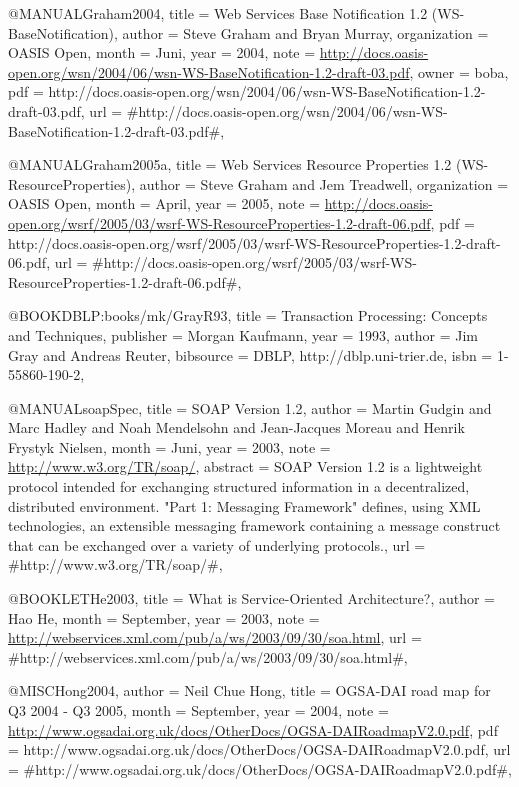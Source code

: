 @MANUAL{Graham2004,
  title = {{Web Services Base Notification 1.2 (WS-BaseNotification)}},
  author = {Steve Graham and Bryan Murray},
  organization = {OASIS Open},
  month = {Juni},
  year = {2004},
  note = {\url{http://docs.oasis-open.org/wsn/2004/06/wsn-WS-BaseNotification-1.2-draft-03.pdf}},
  owner = {boba},
  pdf = {http://docs.oasis-open.org/wsn/2004/06/wsn-WS-BaseNotification-1.2-draft-03.pdf},
  url = {#http://docs.oasis-open.org/wsn/2004/06/wsn-WS-BaseNotification-1.2-draft-03.pdf#},
}

@MANUAL{Graham2005a,
  title = {{Web Services Resource Properties 1.2 (WS-ResourceProperties)}},
  author = {Steve Graham and Jem Treadwell},
  organization = {OASIS Open},
  month = {April},
  year = {2005},
  note = {\url{http://docs.oasis-open.org/wsrf/2005/03/wsrf-WS-ResourceProperties-1.2-draft-06.pdf}},
  pdf = {http://docs.oasis-open.org/wsrf/2005/03/wsrf-WS-ResourceProperties-1.2-draft-06.pdf},
  url = {#http://docs.oasis-open.org/wsrf/2005/03/wsrf-WS-ResourceProperties-1.2-draft-06.pdf#},
}

@BOOK{DBLP:books/mk/GrayR93,
  title = {{Transaction Processing: Concepts and Techniques}},
  publisher = {Morgan Kaufmann},
  year = {1993},
  author = {Jim Gray and Andreas Reuter},
  bibsource = {DBLP, http://dblp.uni-trier.de},
  isbn = {1-55860-190-2},
}

@MANUAL{soapSpec,
  title = {{SOAP Version 1.2}},
  author = {Martin Gudgin and Marc Hadley and Noah Mendelsohn and Jean-Jacques
	Moreau and Henrik Frystyk Nielsen},
  month = {Juni},
  year = {2003},
  note = {\url{http://www.w3.org/TR/soap/}},
  abstract = {SOAP Version 1.2 is a lightweight protocol
intended for exchanging
	structured information in a decentralized,
distributed environment.
	"Part 1: Messaging Framework" defines, using XML
technologies, an
	extensible messaging framework containing a message
construct that
	can be exchanged over a variety of underlying protocols.},
  url = {#http://www.w3.org/TR/soap/#},
}

@BOOKLET{He2003,
  title = {{What is Service-Oriented Architecture?}},
  author = {Hao He},
  month = {September},
  year = {2003},
  note = {\url{http://webservices.xml.com/pub/a/ws/2003/09/30/soa.html}},
  url = {#http://webservices.xml.com/pub/a/ws/2003/09/30/soa.html#},
}

@MISC{Hong2004,
  author = {Neil Chue Hong},
  title = {{OGSA-DAI road map for Q3 2004 - Q3 2005}},
  month = {September},
  year = {2004},
  note = {\url{http://www.ogsadai.org.uk/docs/OtherDocs/OGSA-DAIRoadmapV2.0.pdf}},
  pdf = {http://www.ogsadai.org.uk/docs/OtherDocs/OGSA-DAIRoadmapV2.0.pdf},
  url = {#http://www.ogsadai.org.uk/docs/OtherDocs/OGSA-DAIRoadmapV2.0.pdf#},
}

